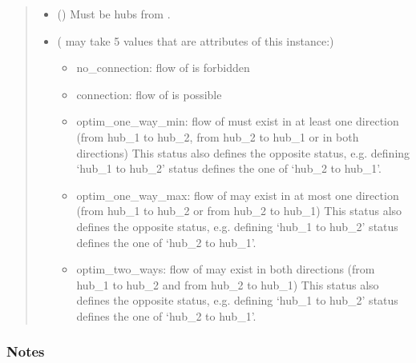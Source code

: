 \documentclass[letterpaper,10pt,english]{sphinxmanual}
\begin{document}
\begin{fulllineitems}
\begin{fulllineitems}
\begin{quote}
\begin{description}
\begin{itemize}
\item {} 
\sphinxAtStartPar
{} ({\hyperref[\detokenize{generated/tamos.Hub:tamos.Hub}]{}}) \textendash{} Must be hubs from .

\item {} 
\sphinxAtStartPar
{} ( may take 5 values that are attributes of this instance:) \textendash{} \begin{itemize}
\item {} 
\sphinxAtStartPar
no\_connection: flow of  is forbidden

\item {} 
\sphinxAtStartPar
connection: flow of  is possible

\item {} 
\sphinxAtStartPar
optim\_one\_way\_min: flow of  must exist in at least one direction
(from hub\_1 to hub\_2, from hub\_2 to hub\_1 or in both directions)
This status also defines the opposite status, e.g. defining ‘hub\_1 to hub\_2’ status defines the one of ‘hub\_2 to hub\_1’.

\item {} 
\sphinxAtStartPar
optim\_one\_way\_max: flow of  may exist in at most one direction
(from hub\_1 to hub\_2 or from hub\_2 to hub\_1)
This status also defines the opposite status, e.g. defining ‘hub\_1 to hub\_2’ status defines the one of ‘hub\_2 to hub\_1’.

\item {} 
\sphinxAtStartPar
optim\_two\_ways: flow of  may exist in both directions
(from hub\_1 to hub\_2 and from hub\_2 to hub\_1)
This status also defines the opposite status, e.g. defining ‘hub\_1 to hub\_2’ status defines the one of ‘hub\_2 to hub\_1’.

\end{itemize}


\end{itemize}

\end{description}\end{quote}
\subsubsection*{Notes}


\end{fulllineitems}
\end{fulllineitems}
\end{document}
